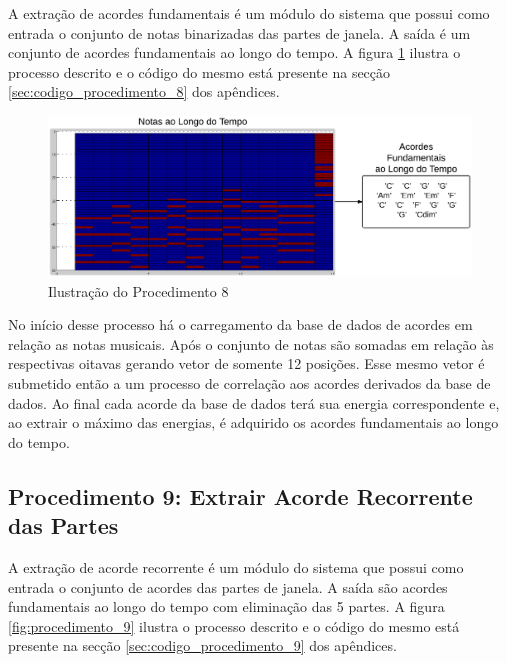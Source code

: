 A extração de acordes fundamentais é um módulo do sistema que possui como entrada o conjunto de notas binarizadas das partes de janela. A saída é um conjunto de acordes fundamentais ao longo do tempo. A figura \ref{fig:procedimento_8} ilustra o processo descrito e o código do mesmo está presente na secção \ref{sec:codigo_procedimento_8} dos apêndices.

\begin{figure}[h] 
  \centering
    \includegraphics[keepaspectratio=true, scale=0.55]{figuras/procedimento_8}
    \caption{Ilustração do Procedimento 8}
    \label{fig:procedimento_8}
\end{figure}


No início desse processo há o carregamento da base de dados de acordes em relação as notas musicais. Após o conjunto de notas são somadas em relação às respectivas oitavas gerando vetor de somente 12 posições. Esse mesmo vetor é submetido então a um processo de correlação aos acordes derivados da base de dados. Ao final cada acorde da base de dados terá sua energia correspondente e, ao extrair o máximo das energias, é adquirido os acordes fundamentais ao longo do tempo.

\subsection{Procedimento 9: Extrair Acorde Recorrente das Partes}
\label{subsec:procedimento_9}

A extração de acorde recorrente é um módulo do sistema que possui como entrada o conjunto de acordes das partes de janela. A saída são acordes fundamentais ao longo do tempo com eliminação das 5 partes. A figura \ref{fig:procedimento_9} ilustra o processo descrito e o código do mesmo está presente na secção \ref{sec:codigo_procedimento_9} dos apêndices.

